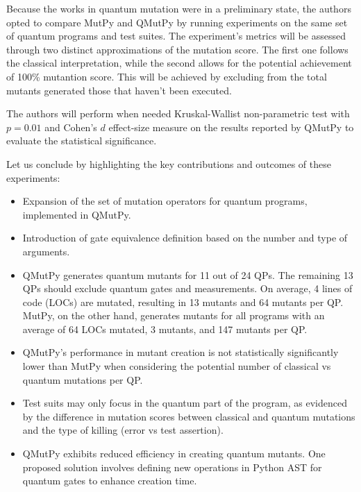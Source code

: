 \begin{itemize}
Because the works in quantum mutation \cite{wang2021qdiff}\cite{mendiluze2021muskit}\cite{ali2021assessing} were in a preliminary state, the authors opted to compare MutPy and QMutPy by running experiments on the same set of quantum programs and test suites. The experiment's metrics will be assessed through two distinct approximations of the mutation score. The first one follows the classical interpretation\cite{jia2010analysis}, while the second allows for the potential achievement of 100\% mutantion score. This will be achieved by excluding from the total mutants generated those that haven't been executed.\newline

The authors will perform when needed Kruskal-Wallist non-parametric test with $p=0.01$ and Cohen's $d$ effect-size measure on the results reported by QMutPy to evaluate the statistical significance.\newline

Let us conclude by highlighting the key contributions and outcomes of these experiments:

\begin{itemize}
    \item Expansion of the set of mutation operators for quantum programs, implemented in QMutPy.
    \item Introduction of gate equivalence definition based on the number and type of arguments.
    \item QMutPy generates quantum mutants for 11 out of 24 QPs. The remaining 13 QPs should exclude quantum gates and measurements. On average, 4 lines of code (LOCs) are mutated, resulting in 13 mutants and 64 mutants per QP. MutPy, on the other hand, generates mutants for all programs with an average of 64 LOCs mutated, 3 mutants, and 147 mutants per QP.
    \item QMutPy's performance in mutant creation is not statistically significantly lower than MutPy when considering the potential number of classical vs quantum mutations per QP.
    \item Test suits may only focus in the quantum part of the program, as evidenced by the difference in mutation scores between classical and quantum mutations and the type of killing (error vs test assertion).
    \item QMutPy exhibits reduced efficiency in creating quantum mutants. One proposed solution involves defining new operations in Python AST for quantum gates to enhance creation time.
\end{itemize}


\end{itemize}

